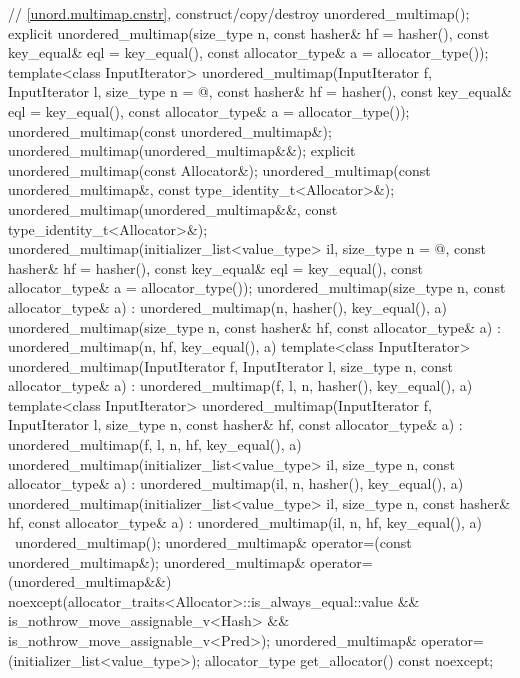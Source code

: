 \begin{codeblock}
{{    // \ref{unord.multimap.cnstr}, construct/copy/destroy
    unordered_multimap();
    explicit unordered_multimap(size_type n,
                                const hasher& hf = hasher(),
                                const key_equal& eql = key_equal(),
                                const allocator_type& a = allocator_type());
    template<class InputIterator>
      unordered_multimap(InputIterator f, InputIterator l,
                         size_type n = @\seebelow@,
                         const hasher& hf = hasher(),
                         const key_equal& eql = key_equal(),
                         const allocator_type& a = allocator_type());
    unordered_multimap(const unordered_multimap&);
    unordered_multimap(unordered_multimap&&);
    explicit unordered_multimap(const Allocator&);
    unordered_multimap(const unordered_multimap&, const type_identity_t<Allocator>&);
    unordered_multimap(unordered_multimap&&, const type_identity_t<Allocator>&);
    unordered_multimap(initializer_list<value_type> il,
                       size_type n = @\seebelow@,
                       const hasher& hf = hasher(),
                       const key_equal& eql = key_equal(),
                       const allocator_type& a = allocator_type());
    unordered_multimap(size_type n, const allocator_type& a)
      : unordered_multimap(n, hasher(), key_equal(), a) { }
    unordered_multimap(size_type n, const hasher& hf, const allocator_type& a)
      : unordered_multimap(n, hf, key_equal(), a) { }
    template<class InputIterator>
      unordered_multimap(InputIterator f, InputIterator l, size_type n, const allocator_type& a)
        : unordered_multimap(f, l, n, hasher(), key_equal(), a) { }
    template<class InputIterator>
      unordered_multimap(InputIterator f, InputIterator l, size_type n, const hasher& hf,
                         const allocator_type& a)
        : unordered_multimap(f, l, n, hf, key_equal(), a) { }
    unordered_multimap(initializer_list<value_type> il, size_type n, const allocator_type& a)
      : unordered_multimap(il, n, hasher(), key_equal(), a) { }
    unordered_multimap(initializer_list<value_type> il, size_type n, const hasher& hf,
                       const allocator_type& a)
      : unordered_multimap(il, n, hf, key_equal(), a) { }
    ~unordered_multimap();
    unordered_multimap& operator=(const unordered_multimap&);
    unordered_multimap& operator=(unordered_multimap&&)
      noexcept(allocator_traits<Allocator>::is_always_equal::value &&
               is_nothrow_move_assignable_v<Hash> &&
               is_nothrow_move_assignable_v<Pred>);
    unordered_multimap& operator=(initializer_list<value_type>);
    allocator_type get_allocator() const noexcept;

}}
\end{codeblock}
